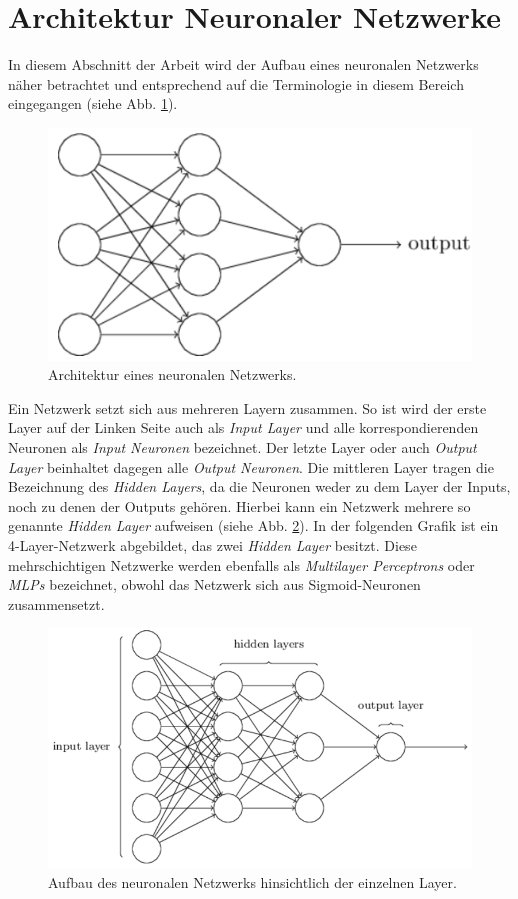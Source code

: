 \section{Architektur Neuronaler Netzwerke}
In diesem Abschnitt der Arbeit wird der Aufbau eines neuronalen Netzwerks näher betrachtet und entsprechend auf die Terminologie in diesem Bereich eingegangen (siehe Abb. \ref{fig:neural_network}). \\
\begin{figure}[hbt]
	\centering
	\includegraphics[scale=0.6]{Bilder/neural_network}
	\caption{Architektur eines neuronalen Netzwerks.} 
	\label{fig:neural_network} 
\end{figure}

\noindent
Ein Netzwerk setzt sich aus mehreren Layern zusammen. So ist wird der erste Layer auf der Linken Seite auch als \textit{Input Layer} und alle korrespondierenden Neuronen als \textit{Input Neuronen} bezeichnet. Der letzte Layer oder auch \textit{Output Layer} beinhaltet dagegen alle \textit{Output Neuronen}. Die mittleren Layer tragen die Bezeichnung des \textit{Hidden Layers}, da die Neuronen weder zu dem Layer der Inputs, noch zu denen der Outputs gehören. Hierbei kann ein Netzwerk mehrere so genannte \textit{Hidden Layer} aufweisen (siehe Abb. \ref{fig:neural_network_extended}). In der folgenden Grafik ist ein 4-Layer-Netzwerk abgebildet, das zwei \textit{Hidden Layer} besitzt. Diese mehrschichtigen Netzwerke werden ebenfalls als \textit{Multilayer Perceptrons} oder \textit{MLPs} bezeichnet, obwohl das Netzwerk sich aus Sigmoid-Neuronen zusammensetzt.
\begin{figure}[hbt]
	\centering
	\includegraphics[scale=0.7]{Bilder/neural_network_extended}
	\caption{Aufbau des neuronalen Netzwerks hinsichtlich der einzelnen Layer.} 
	\label{fig:neural_network_extended} 
\end{figure}

